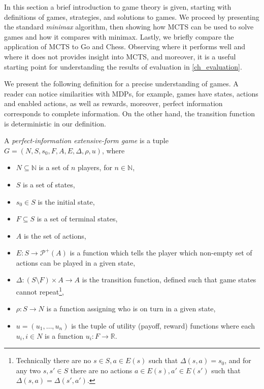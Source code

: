 In this section a brief introduction to game theory is given, starting
with definitions of games, strategies, and solutions to games. We
proceed by presenting the standard {\em minimax} algorithm, then showing
how MCTS can be used to solve games and how it compares with minimax.
Lastly, we briefly compare the application of MCTS to Go and Chess.
Observing where it performs well and where it does not provides insight
into MCTS, and moreover, it is a useful starting point for understanding
the results of evaluation in \autoref{ch_evaluation}.

We present the following definition for a precise understanding of games.
A reader can notice similarities with MDPs, for
example, games have states, actions and enabled actions, as well as
rewards, moreover, perfect information corresponds to complete
information. On the other hand, the transition function is
deterministic in our definition.

\begin{definition}
    A {\em perfect-information extensive-form game}
    is a tuple $G = (N, S, s_0, F, A, E, \Delta, \rho, u)$,
    where
    \begin{itemize}
        \item $N \subseteq \mathbb{N}$ is a set of $n$ players,
            for $n \in \mathbb{N}$,
        \item $S$ is a set of states,
        \item $s_0 \in S$ is the initial state,
        \item $F \subseteq S$ is a set of terminal states,
        \item $A$ is the set of actions,
        \item $E : S \to \mathcal{P}^+(A)$ is a function which tells the player
            which non-empty set of actions can be played in a given state,
        \item $\Delta : (S \setminus F) \times A \to A$ is the
            transition function, defined such that game states cannot
            repeat\footnote{
                Technically there are no $s \in S, a \in E(s)$ such that
                $\Delta(s,a) = s_0$, and for any two $s,s' \in S$ there
                are no actions $a \in E(s), a' \in E(s')$ such that
                $\Delta(s,a) = \Delta(s',a')$.
            },
        \item $\rho : S \to N$ is a function assigning who is on turn in
            a given state, %
        \item $u = (u_1,\ldots,u_{n})$ is the tuple of
            utility (payoff, reward) functions where each $u_i, i \in N$
            is a function $u_i : F \to \mathbb{R}$.
    \end{itemize}
\end{definition}

